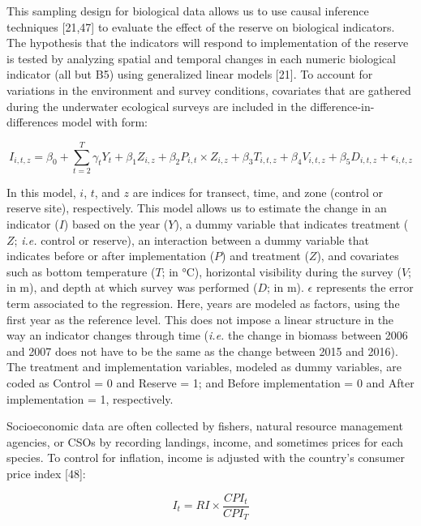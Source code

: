 \documentclass[12pt,]{article}
\begin{document}
This sampling design for biological data allows us to use causal
inference techniques {[}21,47{]} to evaluate the effect of the reserve
on biological indicators. The hypothesis that the indicators will
respond to implementation of the reserve is tested by analyzing spatial
and temporal changes in each numeric biological indicator (all but B5)
using generalized linear models {[}21{]}. To account for variations in
the environment and survey conditions, covariates that are gathered
during the underwater ecological surveys are included in the
difference-in-differences model with form:

\begin{equation}I_{i,t,z}=\beta_0 + \sum_{t = 2}^T\gamma_{t}Y_t + \beta_1Z_{i,z} + \beta_2P_{i,t}\times Z_{i,z} + \beta_3T_{i,t,z} + \beta_4V_{i,t,z} + \beta_5D_{i,t,z} + \epsilon_{i,t,z}\end{equation}

In this model, \(i\), \(t\), and \(z\) are indices for transect, time,
and zone (control or reserve site), respectively. This model allows us
to estimate the change in an indicator (\(I\)) based on the year
(\(Y\)), a dummy variable that indicates treatment (\(Z\); \emph{i.e.}
control or reserve), an interaction between a dummy variable that
indicates before or after implementation (\(P\)) and treatment (\(Z\)),
and covariates such as bottom temperature (\(T\); in °C), horizontal
visibility during the survey (\(V\); in m), and depth at which survey
was performed (\(D\); in m). \(\epsilon\) represents the error term
associated to the regression. Here, years are modeled as factors, using
the first year as the reference level. This does not impose a linear
structure in the way an indicator changes through time (\emph{i.e.} the
change in biomass between 2006 and 2007 does not have to be the same as
the change between 2015 and 2016). The treatment and implementation
variables, modeled as dummy variables, are coded as Control = 0 and
Reserve = 1; and Before implementation = 0 and After implementation = 1,
respectively.

Socioeconomic data are often collected by fishers, natural resource
management agencies, or CSOs by recording landings, income, and
sometimes prices for each species. To control for inflation, income is
adjusted with the country's consumer price index {[}48{]}:

\begin{equation}I_t = RI\times \frac{CPI_t}{CPI_T}\end{equation}
\end{document}
